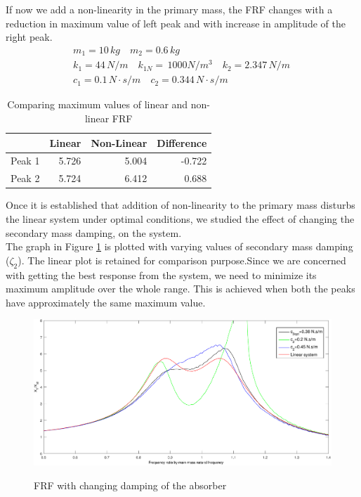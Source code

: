 If now we add a non-linearity in the primary mass,
the FRF changes with a reduction in maximum value of left peak and with increase in amplitude of the right peak.
\begin{align}
&m_1 = 10\,kg\quad m_2 = 0.6\,kg\quad \\
&k_1=44\, N/m\quad
k_{1N} = \,1000 N/m^3\quad k_2 = 2.347\, N/m \quad \\
&c_1 = 0.1 \,N\cdot s/m \quad
c_2 = 0.344 \,N\cdot s/m 
\end{align}
\begin{table}
\centering
\caption{Comparing maximum values of linear and non-linear FRF}
\begin{tabular}{|r|r|r|r|}
\hline
 & Linear & Non-Linear & Difference \\ \hline
Peak 1 & 5.726 & 5.004 & -0.722\\
Peak 2 & 5.724  & 6.412 & 0.688\\ \hline
\end{tabular}
\end{table}
Once it is established that addition of non-linearity to the primary mass disturbs the linear system under optimal conditions, we studied the effect of changing the secondary mass damping, on the system.\\
The graph in Figure \ref{changingzeta} is plotted with varying values of secondary mass damping ($\zeta_2$). The linear plot is retained for comparison purpose.Since we are concerned with getting the best response from the system, we need to minimize its maximum amplitude over the whole range. This is achieved when both the peaks have approximately the same maximum value.\\[0.2in]
\begin{figure}[h!]
\includegraphics[width=\textwidth,height=0.5\textwidth]{"figures/change"}\\[0.2in] 
\caption{FRF with changing damping of the absorber}
\label{changingzeta}
\end{figure}
